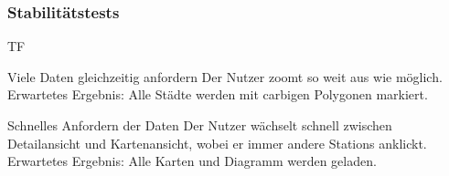 \subsubsection{Stabilitätstests}
\begin{Kriterien}{TF}

	\item[Viele Daten gleichzeitig anfordern] Der Nutzer zoomt so weit aus wie möglich.\\ Erwartetes Ergebnis: Alle Städte werden mit carbigen Polygonen markiert.

	\item[Schnelles Anfordern der Daten] Der Nutzer wächselt schnell zwischen Detailansicht und Kartenansicht, wobei er immer andere \glspl{Station} anklickt. \\ Erwartetes Ergebnis: Alle Karten und Diagramm werden geladen.

\end{Kriterien}
